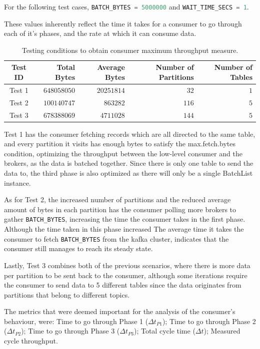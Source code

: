 For the following test cases, \lstinline[language=Python]{BATCH_BYTES = 5000000}
and \lstinline[language=Python]{WAIT_TIME_SECS = 1}.

These values inherently reflect the time it takes for a consumer to go through
each of it's phases, and the rate at which it can consume data.

\begin{table}[H] \centering \caption{Testing conditions to obtain consumer
    maximum throughput measure.} \begin{tabular}{ |c|r|r|r|r| } \hline
        \textbf{Test ID} & \textbf{Total Bytes} & \textbf{Average Bytes} &
        \textbf{Number of Partitions} & \textbf{Number of Tables} \\ \hline Test
    1 & $648058050$ & $20251814$ & $32$ & $1$ \\ Test 2 & $100140747$ & $863282$
    & $116$ & $5$ \\ Test 3 & $678388069$ & $4711028$ & $144$ & $5$ \\ \hline
    \end{tabular} \end{table}

Test 1 has the consumer fetching records which are all directed to the same
    table, and every partition it visits has enough bytes to satisfy the
    max.fetch.bytes condition, optimizing the throughput between the low-level
    consumer and the brokers, as the data is batched together. Since there is
    only one table to send the data to, the third phase is also optimized as
    there will only be a single BatchList instance.

As for Test 2, the increased number of partitions and the reduced average amount
    of bytes in each partition has the consumer polling more brokers to gather
    \lstinline[language=Python]{BATCH_BYTES}, increasing the time the consumer
    takes in the first phase. Although the time taken in this phase increased
    The average time it takes the consumer to fetch
    \lstinline[language=Python]{BATCH_BYTES} from the kafka cluster, indicates
    that the consumer still manages to reach its steady state.

Lastly, Test 3 combines both of the previous scenarios, where there is more data
    per partition to be sent back to the consumer, although some iterations
    require the consumer to send data to 5 different tables since the data
    originates from partitions that belong to different topics.

The metrics that were deemed important for the analysis of the consumer's
    behaviour, were: Time to go through Phase 1 ($\Delta t_{P1}$); Time to go
    through Phase 2 ($\Delta t_{P2}$); Time to go through Phase 3 ($\Delta
    t_{P3}$); Total cycle time ($\Delta t$); Measured cycle throughput.

